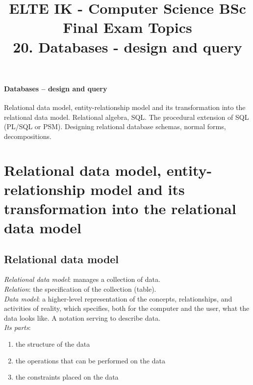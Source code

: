 \documentclass[margin=0px]{article}
\title{\textbf{{\Large ELTE IK - Computer Science BSc} \vspace{0.2cm} \\ {\huge Final Exam Topics}} \vspace{0.3cm} \\ 20. Databases - design and query}
\author{}
\date{}
\newenvironment{tetel}[1]{\paragraph{#1 \\}}{}
\begin{document}
\maketitle

\begin{center}
\end{center}

\begin{tetel}{Databases -- design and query}
    Relational data model, entity-relationship model and its transformation into the relational data model. Relational algebra, SQL. The procedural extension of SQL (PL/SQL or PSM). Designing relational database schemas, normal forms, decompositions.
\end{tetel}

\section{Relational data model, entity-relationship model and its transformation into the relational data model}

\subsection{Relational data model}

\textit{Relational data model}: manages a collection of data. \\
\textit{Relation}: the specification of the collection (table). \\
\textit{Data model}: a higher-level representation of the concepts, relationships, and activities of reality, which specifies, both for the computer and the user, what the data looks like. A notation serving to describe data. \\
\textit{Its parts}:
\begin{enumerate}
    \item the structure of the data
    \item the operations that can be performed on the data
    \item the constraints placed on the data
\end{enumerate}
\end{document}
